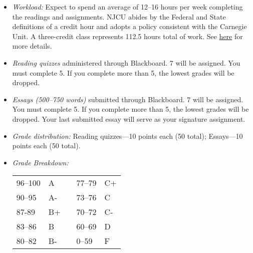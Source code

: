 \documentclass[article,oneside]{memoir}
\begin{document}
\begin{itemize}
\item \textit{Workload:} Expect to spend an average of 12--16 hours per week completing the readings and assignments. NJCU abides by the Federal and State definitions of a credit hour and adopts a policy consistent with the Carnegie Unit. A three-credit class represents 112.5 hours total of work. See \href{http://scottoconnor.org/resources/Credit.pdf}{here} for more details.


\item \textit{Reading quizzes} administered through Blackboard. 7 will be assigned. You must complete 5. If you complete more than 5, the lowest grades will be dropped. %

\item \textit{Essays (500--750 words)} submitted through Blackboard. 7 will be assigned. You must complete 5. If you complete more than 5, the lowest grades will be dropped. Your last submitted essay will serve as your signature assignment. %



  
\item \textit{Grade distribution:} Reading quizzes---10 points each (50 total);  Essays---10 points each (50 total).


\item \textit{Grade Breakdown:}

 \begin{tabular}{ | l | l | p{2cm} | l | l | }
    \hline 
96--100 & A  & &  77--79 &  C+ \\  
90--95 & A- & &  73--76 & C \\
87-89 & B+ &  &  70--72 & C- \\ 
83--86 & B  & &  60--69 & D\\
80--82 & B- & & 0--59 & F\\ \hline
    \end{tabular}


\end{itemize}
\end{document}
